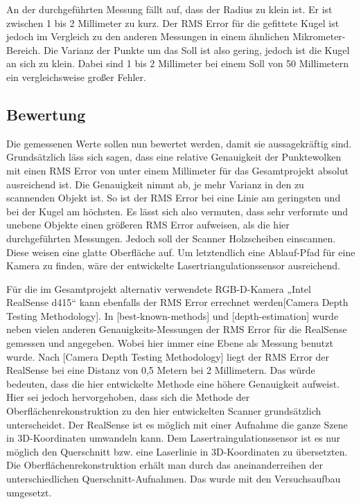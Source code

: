 		An der durchgeführten Messung fällt auf, dass der Radius zu klein ist. Er ist zwischen 1 bis 2 Millimeter zu kurz. Der RMS Error für die gefittete Kugel ist jedoch im Vergleich zu den anderen Messungen in einem ähnlichen Mikrometer-Bereich. Die Varianz der Punkte um das \glqq Soll\grqq{} ist also gering, jedoch ist die Kugel an sich zu klein. Dabei sind 1 bis 2 Millimeter bei einem Soll von 50 Millimetern ein vergleichsweise großer Fehler. 
		
		\subsection{Bewertung}
		
		Die gemessenen Werte sollen nun bewertet werden, damit sie aussagekräftig sind. Grundsätzlich läss sich sagen, dass eine relative Genauigkeit der Punktewolken mit einen RMS Error von unter einem Millimeter für das Gesamtprojekt absolut ausreichend ist. Die Genauigkeit nimmt ab, je mehr Varianz in den zu scannenden Objekt ist. So ist der RMS Error bei eine Linie am geringsten und bei der Kugel am höchsten. Es lässt sich also vermuten, dass sehr verformte und unebene Objekte einen größeren RMS Error aufweisen, als die hier durchgeführten Messungen. Jedoch soll der Scanner Holzscheiben einscannen. Diese weisen eine glatte Oberfläche auf. Um letztendlich eine Ablauf-Pfad für eine Kamera zu finden, wäre der entwickelte Lasertriangulationssensor ausreichend.

		Für die im Gesamtprojekt alternativ verwendete RGB-D-Kamera „Intel RealSense d415“ kann ebenfalls der RMS Error errechnet werden[Camera Depth Testing Methodology]. In [best-known-methods] und [depth-estimation] wurde neben vielen anderen Genauigkeits-Messungen der RMS Error für die RealSense gemessen und angegeben. Wobei hier immer eine Ebene als Messung benutzt wurde. Nach [Camera Depth Testing Methodology] liegt der RMS Error der RealSense bei eine Distanz von 0,5 Metern bei 2 Millimetern. Das würde bedeuten, dass die hier entwickelte Methode eine höhere Genauigkeit aufweist. Hier sei jedoch hervorgehoben, dass sich die Methode der Oberflächenrekonstruktion zu den hier entwickelten Scanner grundsätzlich unterscheidet. Der RealSense ist es möglich mit einer Aufnahme die ganze Szene in 3D-Koordinaten umwandeln kann. Dem Lasertraingulationssensor ist es nur möglich den Querschnitt bzw. eine Laserlinie in 3D-Koordinaten zu übersetzten. Die Oberflächenrekonstruktion erhält man durch das aneinanderreihen der unterschiedlichen Querschnitt-Aufnahmen. Das wurde mit den Versuchsaufbau umgesetzt.
		
